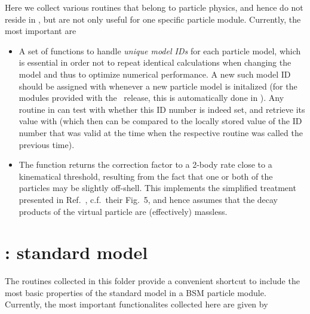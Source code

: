 Here we collect various routines that belong to particle physics, and hence do not reside in ,
but are not only useful for one specific particle module. Currently, the most important are
\begin{itemize}
\item A set of functions to handle {\it unique model IDs} for each particle model, which is essential
        in order not to repeat identical calculations when changing the model and thus to optimize 
        numerical performance. A new such model 
        ID should be assigned with  whenever a new particle model is initalized 
        (for the modules provided with the \ds\ release, this is automatically done in ).
        Any routine in  can test with  whether this ID number
        is indeed set, and retrieve its value with  (which then can be compared 
        to the locally stored value of the ID number that was valid at the time when the respective routine 
        was called the previous time).
\item The function  returns the correction factor to a 2-body rate close to a 
         kinematical threshold, resulting from the fact that one or both of the particles may be slightly off-shell.
         This implements the simplified treatment presented in Ref.~\cite{Bringmann:2017sko}, c.f.~their Fig.~5,
         and hence assumes that the decay products of the virtual particle are (effectively) massless.
\end{itemize}


\section{: standard model}

The routines collected in this folder provide a convenient shortcut to include the most basic 
properties of the standard model in a BSM particle module. Currently, the most important functionalites
collected here are given by


